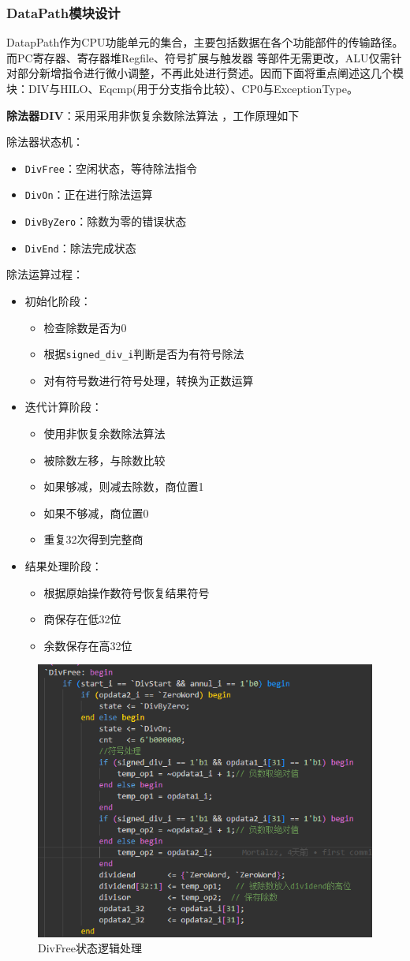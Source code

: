 \subsubsection{DataPath模块设计}
DatapPath作为CPU功能单元的集合，主要包括数据在各个功能部件的传输路径。而PC寄存器、寄存器堆Regfile、符号扩展与触发器 等部件无需更改，ALU仅需针对部分新增指令进行微小调整，不再此处进行赘述。因而下面将重点阐述这几个模块：DIV与HILO、Eqcmp(用于分支指令比较）、CP0与ExceptionType。

\textbf{除法器DIV}：采用采用非恢复余数除法算法 ，工作原理如下

除法器状态机：
\begin{itemize}
\item \verb|DivFree|：空闲状态，等待除法指令
\item \verb|DivOn|：正在进行除法运算
\item \verb|DivByZero|：除数为零的错误状态
\item \verb|DivEnd|：除法完成状态
\end{itemize}
除法运算过程：
\begin{itemize}
\item 初始化阶段：
\begin{itemize}
	\item 检查除数是否为0
	\item 根据\verb|signed_div_i|判断是否为有符号除法
	\item 对有符号数进行符号处理，转换为正数运算
\end{itemize}
\item 迭代计算阶段：
\begin{itemize}
	\item 使用非恢复余数除法算法
	\item 被除数左移，与除数比较
	\item 如果够减，则减去除数，商位置1
	\item 如果不够减，商位置0
	\item 重复32次得到完整商
\end{itemize}
\item 结果处理阶段：
\begin{itemize}
	\item 根据原始操作数符号恢复结果符号
	\item 商保存在低32位
	\item 余数保存在高32位
\end{itemize}
\end{itemize}

\begin{figure}[h]
\centering
\includegraphics[width=0.5\linewidth]{image/p2.png}
\caption{DivFree状态逻辑处理}
\label{fig:enter-label}
\end{figure}

